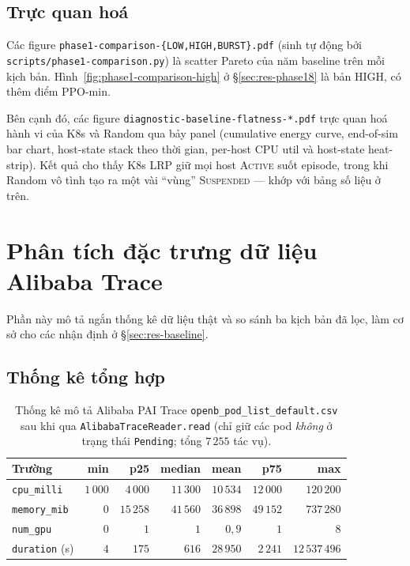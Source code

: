 \subsection{Trực quan hoá}

Các figure \texttt{phase1-comparison-\{LOW,HIGH,BURST\}.pdf} (sinh
tự động bởi \texttt{scripts/phase1-comparison.py}) là scatter Pareto
của năm baseline trên mỗi kịch bản. Hình~\ref{fig:phase1-comparison-high}
ở §\ref{sec:res-phase18} là bản HIGH, có thêm điểm PPO-min.

Bên cạnh đó, các figure \texttt{diagnostic-baseline-flatness-*.pdf}
trực quan hoá hành vi của K8s và Random qua bảy panel
(cumulative energy curve, end-of-sim bar chart, host-state stack
theo thời gian, per-host CPU util và host-state heat-strip). Kết
quả cho thấy K8s LRP giữ mọi host \textsc{Active} suốt episode,
trong khi Random vô tình tạo ra một vài ``vùng''
\textsc{Suspended} --- khớp với bảng số liệu ở trên.


\section{Phân tích đặc trưng dữ liệu Alibaba Trace}
\label{sec:res-trace}

Phần này mô tả ngắn thống kê dữ liệu thật và so sánh ba kịch bản đã
lọc, làm cơ sở cho các nhận định ở §\ref{sec:res-baseline}.

\subsection{Thống kê tổng hợp}

\begin{table}[H]
  \centering
  \caption{Thống kê mô tả Alibaba PAI Trace \texttt{openb\_pod\_list\_default.csv}
  sau khi qua \texttt{AlibabaTraceReader.read} (chỉ giữ các pod
  \emph{không} ở trạng thái \texttt{Pending}; tổng $7\,255$ tác vụ).}
  \label{tab:trace-stats}
  \footnotesize
  \begin{tabular}{lrrrrrr}
    \toprule
    \textbf{Trường} & \textbf{min} & \textbf{p25} & \textbf{median}
                    & \textbf{mean} & \textbf{p75} & \textbf{max} \\
    \midrule
    \texttt{cpu\_milli}        & $1\,000$ & $4\,000$ & $11\,300$ & $10\,534$ & $12\,000$ & $120\,200$ \\
    \texttt{memory\_mib}       & $0$      & $15\,258$ & $41\,560$ & $36\,898$ & $49\,152$ & $737\,280$ \\
    \texttt{num\_gpu}          & $0$      & $1$       & $1$       & $0{,}9$   & $1$       & $8$ \\
    \texttt{duration} (s)      & $4$      & $175$     & $616$     & $28\,950$ & $2\,241$  & $12\,537\,496$ \\
    \bottomrule
  \end{tabular}
\end{table}

